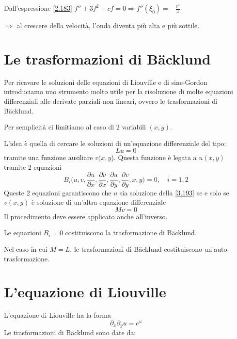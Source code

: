 \documentclass[a4paper,11pt]{report}
\begin{document}
Dall'espressione \eqref{2.183} $f'' + 3f^2 - cf=0 \Rightarrow f''(\xi_0)=-\frac{c^2}{4}$

$\Rightarrow$ al crescere della velocit\`a, l'onda diventa pi\`u alta e pi\`u sottile.

\section{Le trasformazioni di B\"acklund}

Per ricavare le soluzioni delle equazioni di Liouville e di sine-Gordon introduciamo uno strumento molto utile per la risoluzione di molte equazioni differenziali alle derivate parziali non lineari, ovvero le trasformazioni di B\"acklund.

Per semplicit\`a ci limitiamo al caso di 2 variabili $(x,y)$.

L'idea \`e quella di cercare le soluzioni di un'equazione differenziale del tipo:
\begin{equation}
L u=0
\label{3.193}
\end{equation}
tramite una funzione ausiliare $v(x,y$). Questa funzione \`e legata a $u(x,y)$ tramite 2 equazioni
\begin{equation}
B_i\Big(u, v, \frac{\partial u}{\partial x}, \frac{\partial v}{\partial x}, \frac{\partial u}{\partial y}, \frac{\partial v}{\partial y}, x, y\Big)=0, \quad i=1,2 
\label{3.194}
\end{equation}
Queste 2 equazioni garantiscono che $u$ sia soluzione della \eqref{3.193} se e solo se $v(x,y)$ \`e soluzione di un'altra equazione differenziale
\begin{equation}
Mv=0 
\label{3.195}
\end{equation}
Il procedimento deve essere applicato anche all'inverso.

Le equazioni $B_i=0$ costituiscono la trasformazione di B\"acklund.

Nel caso in cui $M=L$, le trasformazioni di B\"acklund costituiscono un'auto-trasformazione.

\section{L'equazione di Liouville}

L'equazione di Liouville ha la forma
\begin{equation}
\partial_x \partial_y u = e^u 
\label{3.196}
\end{equation}
Le trasformazioni di B\"acklund sono date da:
\end{document}
